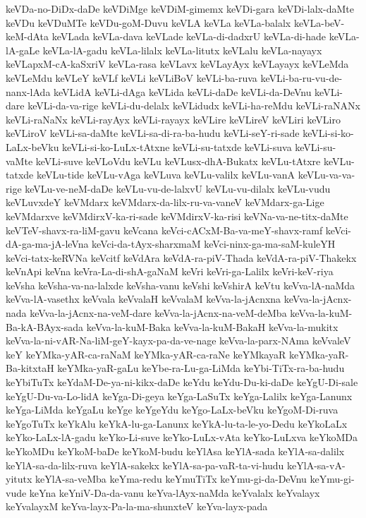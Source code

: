 {keVDa-no-DiDx-daDe
keVDiMge
keVDiM-gimemx
keVDi-gara
keVDi-lalx-daMte
keVDu
keVDuMTe
keVDu-goM-Duvu
keVLA
keVLa
keVLa-balalx
keVLa-beV-keM-dAta
keVLada
keVLa-dava
keVLade
keVLa-di-dadxrU
keVLa-di-hade
keVLa-lA-gaLe
keVLa-lA-gadu
keVLa-lilalx
keVLa-litutx
keVLalu
keVLa-nayayx
keVLapxM-cA-kaSxriV
keVLa-rasa
keVLavx
keVLayAyx
keVLayayx
keVLeMda
keVLeMdu
keVLeY
keVLf
keVLi
keVLiBoV
keVLi-ba-ruva
keVLi-ba-ru-vu-de-nanx-lAda
keVLidA
keVLi-dAga
keVLida
keVLi-daDe
keVLi-da-DeVnu
keVLi-dare
keVLi-da-va-rige
keVLi-du-delalx
keVLidudx
keVLi-ha-reMdu
keVLi-raNANx
keVLi-raNaNx
keVLi-rayAyx
keVLi-rayayx
keVLire
keVLireV
keVLiri
keVLiro
keVLiroV
keVLi-sa-daMte
keVLi-sa-di-ra-ba-hudu
keVLi-seY-ri-sade
keVLi-si-ko-LaLx-beVku
keVLi-si-ko-LuLx-tAtxne
keVLi-su-tatxde
keVLi-suva
keVLi-su-vaMte
keVLi-suve
keVLoVdu
keVLu
keVLusx-dhA-Bukatx
keVLu-tAtxre
keVLu-tatxde
keVLu-tide
keVLu-vAga
keVLuva
keVLu-valilx
keVLu-vanA
keVLu-va-va-rige
keVLu-ve-neM-daDe
keVLu-vu-de-lalxvU
keVLu-vu-dilalx
keVLu-vudu
keVLuvxdeY
keVMdarx
keVMdarx-da-lilx-ru-va-vaneV
keVMdarx-ga-Lige
keVMdarxve
keVMdirxV-ka-ri-sade
keVMdirxV-ka-risi
keVNa-va-ne-titx-daMte
keVTeV-shavx-ra-liM-gavu
keVcana
keVci-cACxM-Ba-va-meY-shavx-ramf
keVci-dA-ga-ma-jA-leVna
keVci-da-tAyx-sharxmaM
keVci-ninx-ga-ma-saM-kuleYH
keVci-tatx-keRVNa
keVcitf
keVdAra
keVdA-ra-piV-Thada
keVdA-ra-piV-Thakekx
keVnApi
keVna
keVra-La-di-shA-gaNaM
keVri
keVri-ga-Lalilx
keVri-keV-riya
keVsha
keVsha-va-na-lalxde
keVsha-vanu
keVshi
keVshirA
keVtu
keVva-lA-naMda
keVva-lA-vasethx
keVvala
keVvalaH
keVvalaM
keVva-la-jAcnxna
keVva-la-jAcnx-nada
keVva-la-jAcnx-na-veM-dare
keVva-la-jAcnx-na-veM-deMba
keVva-la-kuM-Ba-kA-BAyx-sada
keVva-la-kuM-Baka
keVva-la-kuM-BakaH
keVva-la-mukitx
keVva-la-ni-vAR-Na-liM-geY-kayx-pa-da-ve-nage
keVva-la-parx-NAma
keVvaleV
keY
keYMka-yAR-ca-raNaM
keYMka-yAR-ca-raNe
keYMkayaR
keYMka-yaR-Ba-kitxtaH
keYMka-yaR-gaLu
keYbe-ra-Lu-ga-LiMda
keYbi-TiTx-ra-ba-hudu
keYbiTuTx
keYdaM-De-ya-ni-kikx-daDe
keYdu
keYdu-Du-ki-daDe
keYgU-Di-sale
keYgU-Du-va-Lo-lidA
keYga-Di-geya
keYga-LaSuTx
keYga-Lalilx
keYga-Lanunx
keYga-LiMda
keYgaLu
keYge
keYgeYdu
keYgo-LaLx-beVku
keYgoM-Di-ruva
keYgoTuTx
keYkAlu
keYkA-lu-ga-Lanunx
keYkA-lu-ta-le-yo-Dedu
keYkoLaLx
keYko-LaLx-lA-gadu
keYko-Li-suve
keYko-LuLx-vAta
keYko-LuLxva
keYkoMDa
keYkoMDu
keYkoM-baDe
keYkoM-budu
keYlAsa
keYlA-sada
keYlA-sa-dalilx
keYlA-sa-da-lilx-ruva
keYlA-sakekx
keYlA-sa-pa-vaR-ta-vi-hudu
keYlA-sa-vA-yitutx
keYlA-sa-veMba
keYma-redu
keYmuTiTx
keYmu-gi-da-DeVnu
keYmu-gi-vude
keYna
keYniV-Da-da-vanu
keYva-lAyx-naMda
keYvalalx
keYvalayx
keYvalayxM
keYva-layx-Pa-la-ma-shunxteV
keYva-layx-pada
}
